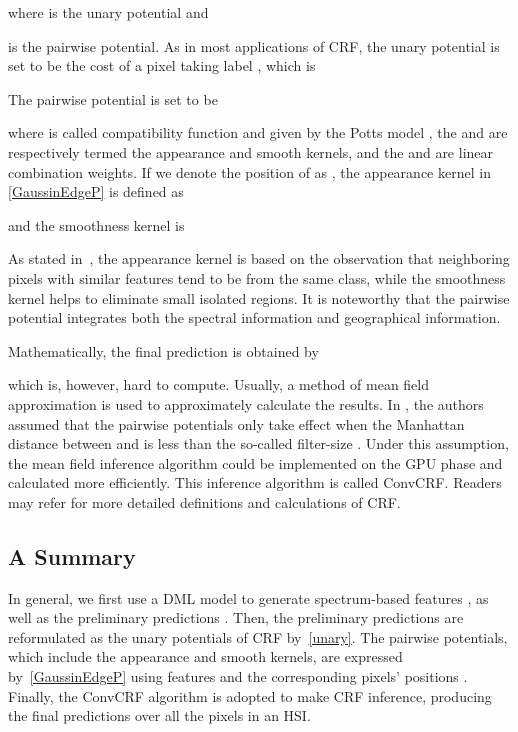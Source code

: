 \documentclass[]{article}
\newcommand{\red}{\color{black}}
\newcommand{\magentaso}{\color{black}}
\begin{document}
where  is the unary potential and 

is the pairwise potential.
As in most applications of CRF, the unary potential is set {\magentaso to be} the cost of a pixel  taking label ,
which is

The pairwise potential is set to be
	
	{\red where  is called compatibility function and given by the Potts model
	, 
	the  and  are respectively termed the appearance and smooth kernels, 
	and the  and  are linear combination weights.}
	If we denote the position of  as , the appearance kernel  in \eqref{GaussinEdgeP} is defined as
	
	and the smoothness kernel  is
	
As stated in~\cite{krahenbuhl2011efficient}, the appearance kernel is based on the observation 
that neighboring pixels with similar features tend to be from the same class, 
while the smoothness kernel helps to eliminate small isolated regions.
It is noteworthy that the pairwise potential integrates both the spectral information and 
geographical information.





Mathematically, the final prediction is obtained by

which is, however, hard to compute.
Usually, a method of mean field approximation \cite{krahenbuhl2011efficient} is used to 
approximately calculate the results.
In \cite{teichmann2018convolutional}, the authors assumed that the pairwise potentials
only take effect when the Manhattan distance between  and  is less than
the so-called filter-size . Under this assumption, the mean field inference algorithm  
{\magentaso could be} implemented on the GPU phase and
calculated more efficiently. This inference algorithm is called
ConvCRF. Readers may refer \cite{krahenbuhl2011efficient, teichmann2018convolutional}
for more detailed definitions and calculations of CRF.

\subsection{\red A Summary}
{\red In general, we first use a DML model to generate spectrum-based features , as well as
the preliminary predictions . 
Then, {\magentaso the preliminary predictions  are reformulated as the unary
potentials of CRF by~\eqref{unary}.} The pairwise potentials, which include the appearance and smooth kernels, 
are expressed by~\eqref{GaussinEdgeP} using features  and 
{\red the corresponding pixels' positions }.
Finally, the ConvCRF algorithm is adopted to make CRF inference, 
producing the final predictions {\magentaso over all the pixels in an HSI}.}
\end{document}
